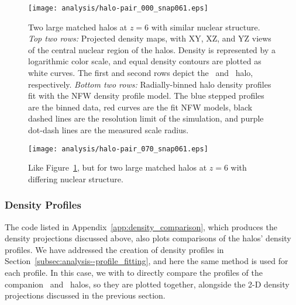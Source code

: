 \begin{figure}[tp]
	\centering
	\texttt{[image: analysis/halo-pair\_000\_snap061.eps]}
	\caption[Comparison of two large well-fit companion halos $z = 6$.]{\footnotesize Two large matched halos at $z = 6$ with similar nuclear structure.  \emph{Top two rows:}  Projected density maps, with XY, XZ, and YZ views of the central nuclear region of the halos.  Density is represented by a logarithmic color scale, and equal density contours are plotted as white curves.  The first and second rows depict the \lpt\ and \za\ halo, respectively.  \emph{Bottom two rows:}  Radially-binned halo density profiles fit with the NFW density profile model.  The blue stepped profiles are the binned data, red curves are the fit NFW models, black dashed lines are the resolution limit of the simulation, and purple dot-dash lines are the measured scale radius.}
	\label{fig:density_comparison_000}
\end{figure}

\begin{figure}[tp]
	\centering
	\texttt{[image: analysis/halo-pair\_070\_snap061.eps]}
	\caption[Comparison of two large companion halos $z = 6$ with differing nuclear structure.]{\footnotesize Like Figure~\ref{fig:density_comparison_000}, but for two large matched halos at $z = 6$ with differing nuclear structure.}
	\label{fig:density_comparison_070}
\end{figure}



\subsubsection{Density Profiles}
\label{subsubsec:analysis--halo_comparison--density_profiles}


The code listed in Appendix~\ref{app:density_comparison}, which produces the density projections discussed above, also plots comparisons of the halos' density profiles.  We have addressed the creation of density profiles in Section~\ref{subsec:analysis--profile_fitting}, and here the same method is used for each profile.  In this case, we with to directly compare the profiles of the companion \lpt\ and \za\ halos, so they are plotted together, alongside the 2-D density projections discussed in the previous section.

